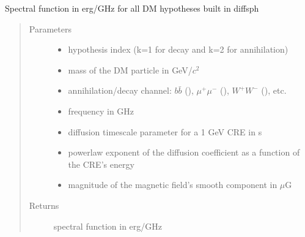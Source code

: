 \documentclass[letterpaper,10pt,english]{sphinxmanual}
\begin{document}

\begin{fulllineitems}
\label{\detokenize{diffsph.spectra:diffsph.spectra.synchrotron.X_DM}}
\sphinxAtStartPar
Spectral function in erg/GHz for all DM hypotheses built in diffsph
\begin{quote}\begin{description}
\item[{Parameters}] \leavevmode\begin{itemize}
\item {} 
\sphinxAtStartPar
{} \textendash{} hypothesis index (k=1 for decay and k=2 for annihilation)

\item {} 
\sphinxAtStartPar
{} \textendash{} mass of the DM particle in GeV/\(c^2\)

\item {} 
\sphinxAtStartPar
{} \textendash{} annihilation/decay channel: \(b\bar b\) (), \(\mu^+ \mu^-\) (), \(W^+ W^-\) (), etc.

\item {} 
\sphinxAtStartPar
{} \textendash{} frequency in GHz

\item {} 
\sphinxAtStartPar
{} \textendash{} diffusion time\sphinxhyphen{}scale parameter for a 1 GeV CRE in s

\item {} 
\sphinxAtStartPar
{} \textendash{} power\sphinxhyphen{}law exponent of the diffusion coefficient as a function of the CRE’s energy

\item {} 
\sphinxAtStartPar
{} \textendash{} magnitude of the magnetic field’s smooth component in \(\mu\)G

\end{itemize}

\item[{Returns}] \leavevmode
\sphinxAtStartPar
spectral function in erg/GHz

\end{description}\end{quote}

\end{fulllineitems}
\end{document}
